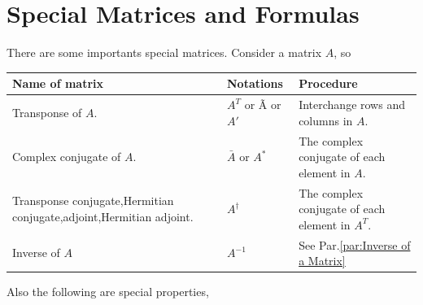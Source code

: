        \section{Special Matrices and Formulas}
            There are some importants special matrices. Consider a matrix $A$, so

            \begin{center}
                \begin{tabular}{m{11em} m{10em} m{10em}}
                    \hline
                    Name of matrix & Notations & Procedure \\
                    \hline\hline
                    Transponse of $A$. & $A^T$ or \~A or $A'$ & Interchange rows and columns in $A$. \\

                    Complex conjugate of $A$. & $\bar{A}$ or $A^*$ & The complex conjugate of each element in $A$. \\

                    Transponse conjugate,\newline Hermitian conjugate,\newline adjoint,\newline Hermitian adjoint.\newline & 
                    $A^\dagger$ & The complex conjugate of each element in $A^T$.\\

                    Inverse of $A$ & $A^{-1}$ & See Par.\eqref{par:Inverse of a Matrix}\\

                \end{tabular}
                \label{tab:special matrices}
            \end{center}
            Also the following are special properties, 
